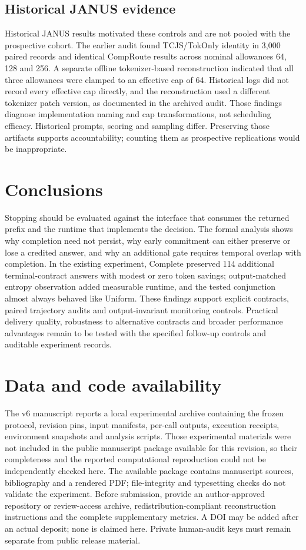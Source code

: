 \documentclass[12pt,a4paper]{article}
\begin{document}
\subsection{Historical JANUS evidence}
Historical JANUS results motivated these controls and are not pooled with the prospective cohort. The earlier audit found TCJS/TokOnly identity in 3,000 paired records and identical CompRoute results across nominal allowances 64, 128 and 256. A separate offline tokenizer-based reconstruction indicated that all three allowances were clamped to an effective cap of 64. Historical logs did not record every effective cap directly, and the reconstruction used a different tokenizer patch version, as documented in the archived audit. Those findings diagnose implementation naming and cap transformations, not scheduling efficacy. Historical prompts, scoring and sampling differ. Preserving those artifacts supports accountability; counting them as prospective replications would be inappropriate.

\section{Conclusions}
Stopping should be evaluated against the interface that consumes the returned prefix and the runtime that implements the decision. The formal analysis shows why completion need not persist, why early commitment can either preserve or lose a credited answer, and why an additional gate requires temporal overlap with completion. In the existing experiment, Complete preserved 114 additional terminal-contract answers with modest or zero token savings; output-matched entropy observation added measurable runtime, and the tested conjunction almost always behaved like Uniform. These findings support explicit contracts, paired trajectory audits and output-invariant monitoring controls. Practical delivery quality, robustness to alternative contracts and broader performance advantages remain to be tested with the specified follow-up controls and auditable experiment records.

\section*{Data and code availability}
The v6 manuscript reports a local experimental archive containing the frozen protocol, revision pins, input manifests, per-call outputs, execution receipts, environment snapshots and analysis scripts. Those experimental materials were not included in the public manuscript package available for this revision, so their completeness and the reported computational reproduction could not be independently checked here. The available package contains manuscript sources, bibliography and a rendered PDF; file-integrity and typesetting checks do not validate the experiment. Before submission, provide an author-approved repository or review-access archive, redistribution-compliant reconstruction instructions and the complete supplementary metrics. A DOI may be added after an actual deposit; none is claimed here. Private human-audit keys must remain separate from public release material.
\end{document}

